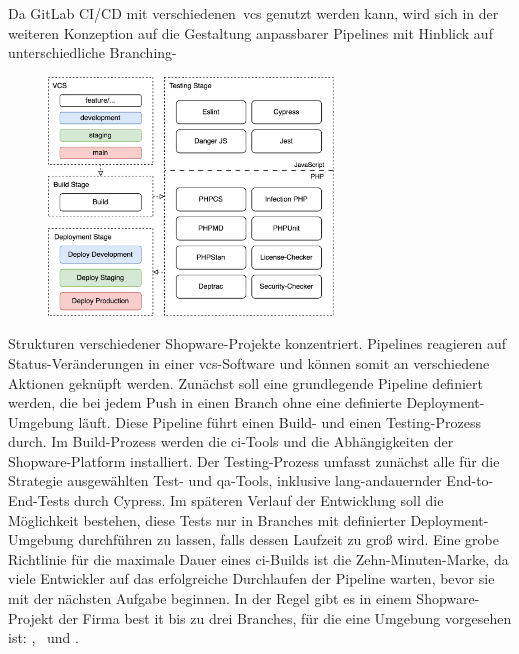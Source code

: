 Da GitLab CI/CD mit verschiedenen\ \acrshort{vcs} genutzt werden kann, wird sich in der weiteren Konzeption auf die
Gestaltung anpassbarer Pipelines mit Hinblick auf unterschiedliche Branching-
\begin{figure}
    \centering
    \includegraphics[width=0.675\textwidth]{images/content/ci-pipeline-concept}
    \label{fig:ci-pipeline-concept}
\end{figure}
Strukturen verschiedener Shopware-Projekte konzentriert.
Pipelines reagieren auf Status-Veränderungen in einer \acrshort{vcs}-Software und können somit an verschiedene
Aktionen geknüpft werden.
Zunächst soll eine grundlegende Pipeline definiert werden, die bei jedem Push in einen Branch ohne eine definierte
Deployment-Umgebung läuft.
Diese Pipeline führt einen Build- und einen Testing-Prozess durch.
Im Build-Prozess werden die \acrshort{ci}-Tools und die Abhängigkeiten der Shopware-Platform installiert.
Der Testing-Prozess umfasst zunächst alle für die Strategie ausgewählten Test- und \acrshort{qa}-Tools, inklusive
lang-andauernder End-to-End-Tests durch Cypress.
Im späteren Verlauf der Entwicklung soll die Möglichkeit bestehen, diese Tests nur in Branches mit definierter
Deployment-Umgebung durchführen zu lassen, falls dessen Laufzeit zu groß wird.
Eine grobe Richtlinie für die maximale Dauer eines \acrshort{ci}-Builds ist die Zehn-Minuten-Marke, da viele Entwickler
auf das erfolgreiche Durchlaufen der Pipeline warten, bevor sie mit der nächsten Aufgabe beginnen.
In der Regel gibt es in einem Shopware-Projekt der Firma best it bis zu drei Branches, für die eine Umgebung vorgesehen
ist: ,\  und .

